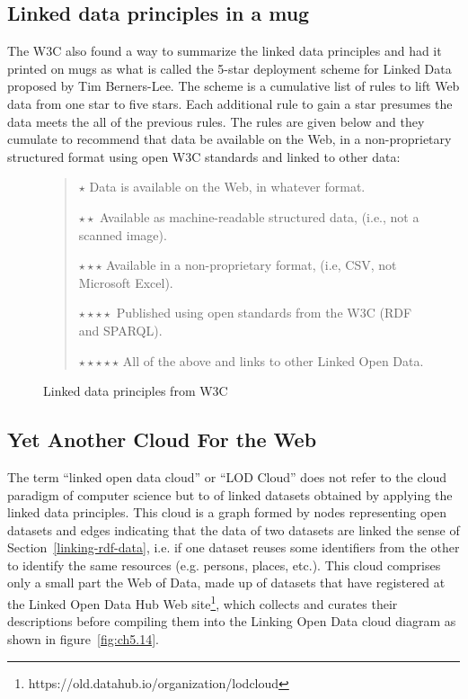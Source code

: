 \hypertarget{linked-data-principles-in-a-mug}{%
\subsection{Linked data principles in a
mug}\label{linked-data-principles-in-a-mug}}

The W3C also found a way to summarize the linked data principles and had
it printed on mugs as what is called the 5-star deployment scheme for
Linked Data proposed by Tim Berners-Lee. The scheme is a cumulative list
of rules to lift Web data from one star to five stars. Each additional
rule to gain a star presumes the data meets the all of the previous
rules. The rules are given below and they cumulate to recommend that
data be available on the Web, in a non-proprietary structured format
using open W3C standards and linked to other data:

\begin{figure}
\begin{quote}
$\star{}$ Data is available on the Web, in whatever format.

$\star{}\star{}$ Available as machine-readable structured data, (i.e., not a scanned
image).

$\star\star\star$ Available in a non-proprietary format, (i.e, CSV, not Microsoft
Excel).

$\star\star\star\star$ Published using open standards from the W3C (RDF and SPARQL).

$\star\star\star\star\star$ All of the above and links to other Linked Open Data.
\end{quote}
\caption{Linked data principles from W3C}
\label{fig:ch5.13}
\end{figure}


\hypertarget{yet-another-cloud-for-the-web}{%
\subsection{Yet Another Cloud For the
Web}\label{yet-another-cloud-for-the-web}}

The term ``linked open data cloud'' or ``LOD Cloud'' does not refer to
the cloud paradigm of computer science but to of linked datasets
obtained by applying the linked data principles. This cloud is a graph
formed by nodes representing open datasets and edges indicating that the
data of two datasets are linked  the sense of Section~\ref{linking-rdf-data}, i.e. if one dataset reuses some
identifiers from the other to identify the same resources (e.g.
persons, places, etc.). This cloud comprises only a small part the Web
of Data, made up of datasets that have registered at the Linked Open Data
Hub Web site\footnote{https://old.datahub.io/organization/lodcloud}, which collects and curates their descriptions before
compiling them into the Linking Open Data cloud diagram as shown in
figure~\ref{fig:ch5.14}.


